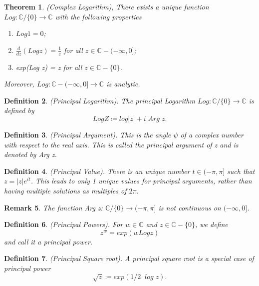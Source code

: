\documentclass[twoside]{article}
\newcounter{lecnum}
\newtheorem{theorem}{Theorem}[lecnum]
\newtheorem{remark}[theorem]{Remark}
\newtheorem{definition}[theorem]{Definition}
\begin{document}
\begin{theorem}(Complex Logarithm), There exists a unique function $Log:\mathbb{C}/\{0\} \rightarrow \mathbb{C}$ with the following properties 
\begin{enumerate}
    \item $Log 1 = 0$;
    \item $\frac{d}{dz}(Log z) = \frac{1}{z}$ for all $z \in \mathbb{C} - (-\infty,0]$;
    \item exp(Log z) = z for all $z \in \mathbb{C} - \{0\}$.
\end{enumerate}
Moreover, $Log: \mathbb{C} - (-\infty,0] \rightarrow \mathbb{C}$ is analytic.
\end{theorem}


\begin{definition}(Principal Logarithm). The principal Logarithm $Log: \mathbb{C}/\{0\} \rightarrow \mathbb{C}$ is defined by
$$
Log Z \coloneqq log|z| + i \;Arg \;z.
$$
\end{definition}


\begin{definition}(Principal Argument). This is the angle $\psi$ of a complex number with respect to the real axis. This is called the principal argument of z and is denoted by Arg z.
\end{definition}

\begin{definition}(Principal Value). There is an unique number $t \in (-\pi,\pi]$ such that $z = |z|e^{it}$. This leads to only 1 unique values for principal arguments, rather than having multiple solutions as multiples of $2\pi$.
\end{definition}

\begin{remark} The function Arg z: $ \mathbb{C}/\{0\} \rightarrow (-\pi,\pi]$ is not continuous on $(-\infty,0]$. 
\end{remark}

\begin{definition}(Principal Powers). For $w \in \mathbb{C}$ and $z \in \mathbb{C} - \{0\}$, we define 
$$
z^w = exp(w Log z)
$$
and call it a principal power.
\end{definition}

\begin{definition}(Principal Square root). A principal square root is a special case of principal power
$$
\sqrt{z} \coloneqq exp(1/2 \;\;log \;z).
$$
\end{definition}
\end{document}
